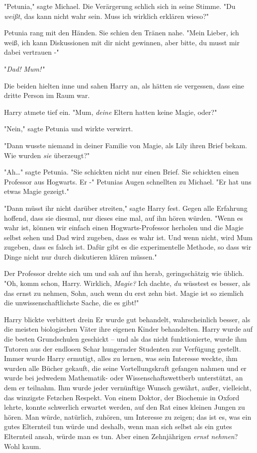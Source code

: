 {"Petunia," sagte Michael. Die Verärgerung schlich sich in seine Stimme. "Du \emph{weißt}, das kann nicht wahr sein. Muss ich wirklich erklären wieso?"

Petunia rang mit den Händen. Sie schien den Tränen nahe. "Mein Lieber, ich weiß, ich kann Diskussionen mit dir nicht gewinnen, aber bitte, du musst mir dabei vertrauen -"

"\emph{Dad! Mum!}\,"

Die beiden hielten inne und sahen Harry an, als hätten sie vergessen, dass eine dritte Person im Raum war.

Harry atmete tief ein. "Mum, \emph{deine} Eltern hatten keine Magie, oder?"

"Nein," sagte Petunia und wirkte verwirrt.

"Dann wusste niemand in deiner Familie von Magie, als Lily ihren Brief bekam. Wie wurden \emph{sie} überzeugt?"

"Ah…" sagte Petunia. "Sie schickten nicht nur einen Brief. Sie schickten einen Professor aus Hogwarts. Er -" Petunias Augen schnellten zu Michael. "Er hat uns etwas Magie gezeigt."

"Dann müsst ihr nicht darüber streiten," sagte Harry fest. Gegen alle Erfahrung hoffend, dass sie diesmal, nur dieses eine mal, auf ihn hören würden. "Wenn es wahr ist, können wir einfach einen Hogwarts-Professor herholen und die Magie selbst sehen und Dad wird zugeben, dass es wahr ist. Und wenn nicht, wird Mum zugeben, dass es falsch ist. Dafür gibt es die experimentelle Methode, so dass wir Dinge nicht nur durch diskutieren klären müssen."

Der Professor drehte sich um und sah auf ihn herab, geringschätzig wie üblich. "Oh, komm schon, Harry. Wirklich, \emph{Magie?} Ich dachte, \emph{du} wüsstest es besser, als das ernst zu nehmen, Sohn, auch wenn du erst zehn bist. Magie ist so ziemlich die unwissenschaftlichste Sache, die es gibt!"

Harry blickte verbittert drein Er wurde gut behandelt, wahrscheinlich besser, als die meisten biologischen Väter ihre eigenen Kinder behandelten. Harry wurde auf die besten Grundschulen geschickt -- und als das nicht funktionierte, wurde ihm Tutoren aus der endlosen Schar hungernder Studenten zur Verfügung gestellt. Immer wurde Harry ermutigt, alles zu lernen, was sein Interesse weckte, ihm wurden alle Bücher gekauft, die seine Vortellungskraft gefangen nahmen und er wurde bei jedwedem Mathematik- oder Wissenschaftswettberb unterstützt, an dem er teilnahm. Ihm wurde jeder vernünftige Wunsch gewährt, außer, vielleicht, das winzigste Fetzchen Respekt. Von einem Doktor, der Biochemie in Oxford lehrte, konnte schwerlich erwartet werden, auf den Rat eines kleinen Jungen zu hören. Man würde, natürlich, zuhören, um Interesse zu zeigen; das ist es, was ein gutes Elternteil tun würde und deshalb, wenn man sich selbst als ein gutes Elternteil ansah, würde man es tun. Aber einen Zehnjährigen \emph{ernst nehmen}? Wohl kaum.

}
